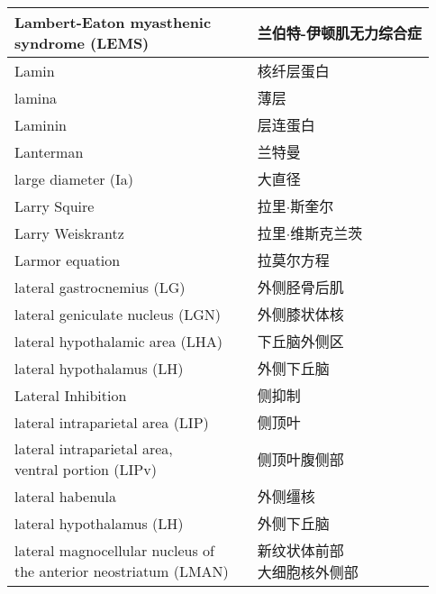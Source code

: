 \begin{longtable}{lll}
	\midrule
	\makecell[l]{Lambert-Eaton myasthenic \\syndrome (LEMS)} && 兰伯特-伊顿肌无力综合症  \\
	
	\midrule
	Lamin     &&  核纤层蛋白  \\
	
	\midrule
	lamina     &&  薄层  \\
	
	\midrule
	Laminin     &&  层连蛋白  \\
	
	\midrule
	Lanterman     &&  兰特曼  \\
	
	\midrule
	large diameter (Ia)     &&  大直径  \\
	
	\midrule
	Larry Squire   && 拉里$\cdot$斯奎尔  \\
	
	\midrule
	Larry Weiskrantz   && 拉里$\cdot$维斯克兰茨  \\
	
	\midrule
	Larmor equation   && 拉莫尔方程  \\
	
	\midrule
	lateral gastrocnemius (LG)  && 外侧胫骨后肌  \\
	
	\midrule
	lateral geniculate nucleus (LGN)   && 外侧膝状体核  \\
	
	\midrule
	lateral hypothalamic area (LHA)  && 下丘脑外侧区  \\
	
	\midrule
	lateral hypothalamus (LH)  && 外侧下丘脑  \\
	
	\midrule
	Lateral Inhibition  && 侧抑制  \\
	
	\midrule
	lateral intraparietal area (LIP)   && 侧顶叶  \\
	
	\midrule
	\makecell[l]{lateral intraparietal area, \\ventral portion (LIPv)}   && 侧顶叶腹侧部  \\
	
	\midrule
	lateral habenula   && 外侧缰核  \\
	
	\midrule
	lateral	hypothalamus (LH)  && 外侧下丘脑  \\
	
	\midrule
	\makecell[l]{lateral magnocellular nucleus of \\ the anterior neostriatum (LMAN)}  && \makecell[l]{新纹状体前部\\大细胞核外侧部}  \\
	

\end{longtable}

